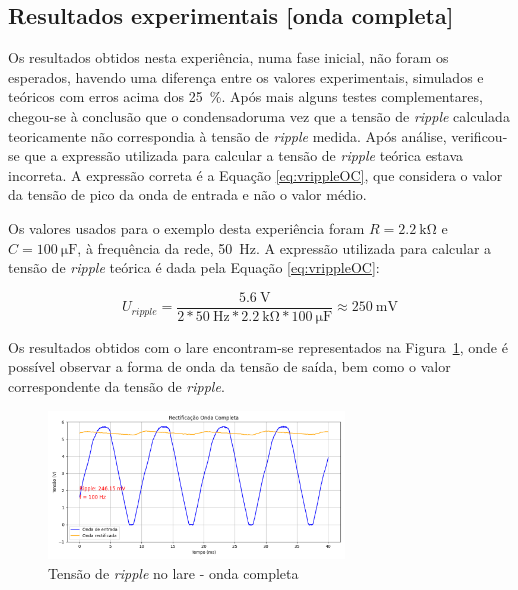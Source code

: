 \subsection{Resultados experimentais [onda completa]}
\label{sec:resultados_RectificadoresOndacompleta}
Os resultados obtidos nesta experiência, numa fase inicial, não foram os esperados, havendo uma diferença entre os valores experimentais, simulados e teóricos com erros acima dos \SI{25}{\percent}. Após mais alguns testes complementares, chegou-se à conclusão que o condensadoruma vez que a tensão de \textit{ripple} calculada teoricamente não correspondia à tensão de \textit{ripple} medida. Após análise, verificou-se que a expressão utilizada para calcular a tensão de \textit{ripple} teórica estava incorreta. A expressão correta é a Equação \ref{eq:vrippleOC}, que considera o valor da tensão de pico da onda de entrada e não o valor médio.


Os valores usados para o exemplo desta experiência foram $R=\SI{2.2}{\kilo\ohm}$ e $C=\SI{100}{\micro\farad}$, à frequência da rede, \SI{50}{\hertz}. A expressão utilizada para calcular a tensão de \textit{ripple} teórica é dada pela Equação \ref{eq:vrippleOC}:

\begin{equation} \label{eq:vrippleOCTeorico}
	U_{ripple} = \frac{\SI{5.6}{\volt}}{2*\SI{50}{\hertz}*\SI{2.2}{\kilo\ohm}*\SI{100}{\micro\farad}} \approx \SI{250}{\milli\volt}
\end{equation}

Os resultados obtidos com o \acrshort{lare} encontram-se representados na Figura~\ref{fig:ripplelareonda}, onde é possível observar a forma de onda da tensão de saída, bem como o valor correspondente da tensão de \textit{ripple}. 

\begin{figure}[hbtp]
	\centering
	\includegraphics[width=0.7\textwidth]{figures/onda-completa.png}
	\caption{Tensão de \textit{ripple} no \acrshort{lare} - onda completa}
	\label{fig:ripplelareonda}
\end{figure}

